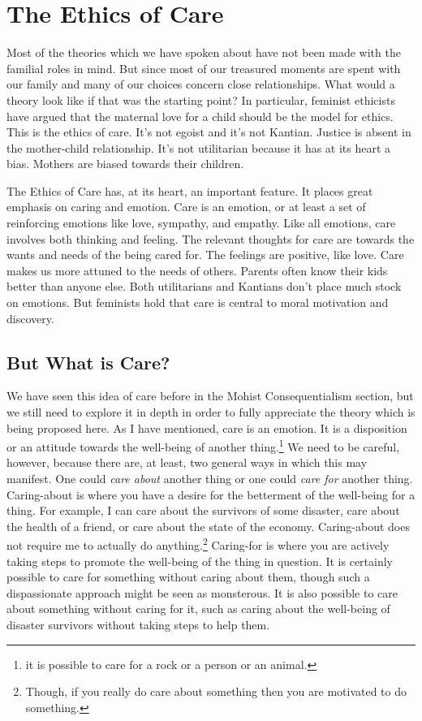 \section{The Ethics of Care}

Most of the theories which we have spoken about have not been made with the familial roles in mind. But since most of our treasured moments are spent with our family and many of our choices concern close relationships. What would a theory look like if that was the starting point? In particular, feminist ethicists have argued that the maternal love for a child should be the model for ethics. This is the ethics of care. It’s not egoist and it’s not Kantian. Justice is absent in the mother-child relationship. It’s not utilitarian because it has at its heart a bias. Mothers are biased towards their children.

The Ethics of Care has, at its heart, an important feature. It places great emphasis on caring and emotion. Care is an emotion, or at least a set of reinforcing emotions like love, sympathy, and empathy. Like all emotions, care involves both thinking and feeling. The relevant thoughts for care are towards the wants and needs of the being cared for. The feelings are positive, like love. Care makes us more attuned to the needs of others. Parents often know their kids better than anyone else. Both utilitarians and Kantians don’t place much stock on emotions. But feminists hold that care is central to moral motivation and discovery.

\subsection{But What is Care?}

We have seen this idea of care before in the Mohist Consequentialism section, but we still need to explore it in depth in order to fully appreciate the theory which is being proposed here. As I have mentioned, care is an emotion. It is a disposition or an attitude towards the well-being of another thing.\footnote{it is possible to care for a rock or a person or an animal.} We need to be careful, however, because there are, at least, two general ways in which this may manifest. One could \emph{care about} another thing or one could \emph{care for} another thing. Caring-about is where you have a desire for the betterment of the well-being for a thing. For example, I can care about the survivors of some disaster, care about the health of a friend, or care about the state of the economy. Caring-about does not require me to actually do anything.\footnote{Though, if you really do care about something then you are motivated to do something.} Caring-for is where you are actively taking steps to promote the well-being of the thing in question. It is certainly possible to care for something without caring about them, though such a dispassionate approach might be seen as monsterous. It is also possible to care about something without caring for it, such as caring about the well-being of disaster survivors without taking steps to help them. 

